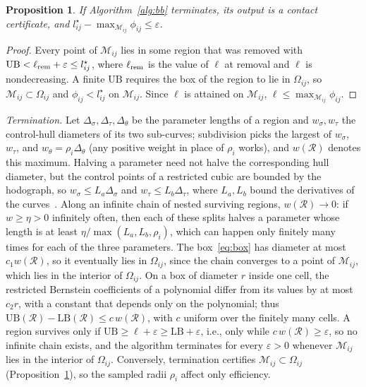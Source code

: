 \documentclass[journal]{IEEEtran}
\newtheorem{proposition}{Proposition}
\theoremstyle{definition}
\newcommand{\Mset}{\mathcal{M}}
\begin{document}
\begin{proposition}\label{prop:bb}
If Algorithm~\ref{alg:bb} terminates, its output is a contact certificate, and
$l^\star_{ij}-\max_{\Mset_{ij}}\phi_{ij}\le\varepsilon$.
\end{proposition}
\begin{proof}
Every point of $\Mset_{ij}$ lies in some region that was removed with
$\mathrm{UB}<\ell_{\rm rem}+\varepsilon\le l^\star_{ij}$, where $\ell_{\rm rem}$ is the value of
$\ell$ at removal and $\ell$ is nondecreasing. A finite $\mathrm{UB}$ requires the box of the region
to lie in $\Omega_{ij}$, so $\Mset_{ij}\subset\Omega_{ij}$ and $\phi_{ij}<l^\star_{ij}$ on
$\Mset_{ij}$. Since $\ell$ is attained on $\Mset_{ij}$, $\ell\le\max_{\Mset_{ij}}\phi_{ij}$.
\end{proof}

\emph{Termination.} Let $\Delta_\sigma,\Delta_\tau,\Delta_\theta$ be the parameter lengths of a
region and $w_\sigma,w_\tau$ the control-hull diameters of its two sub-curves; subdivision picks the
largest of $w_\sigma$, $w_\tau$, and $w_\theta=\rho_i\Delta_\theta$ (any positive weight in place of
$\rho_i$ works), and $w(\mathcal R)$ denotes this maximum. Halving a parameter need not halve the
corresponding hull diameter, but the control points of a restricted cubic are bounded by the
hodograph, so $w_\sigma\le L_a\Delta_\sigma$ and $w_\tau\le L_b\Delta_\tau$, where $L_a,L_b$ bound
the derivatives of the curves~\cite{farin2002curves}. Along an infinite chain of nested surviving
regions, $w(\mathcal R)\to0$: if $w\ge\eta>0$ infinitely often, then each of these splits halves a
parameter whose length is at least $\eta/\max(L_a,L_b,\rho_i)$, which can happen only finitely many
times for each of the three parameters. The box~\eqref{eq:box} has diameter at most
$c_1w(\mathcal R)$, so it eventually lies in $\Omega_{ij}$, since the chain converges to a point of
$\Mset_{ij}$, which lies in the interior of $\Omega_{ij}$. On a box of diameter $r$ inside one cell,
the restricted Bernstein coefficients of a polynomial differ from its values by at most $c_2r$, with
a constant that depends only on the polynomial; thus
$\mathrm{UB}(\mathcal R)-\mathrm{LB}(\mathcal R)\le c\,w(\mathcal R)$, with $c$ uniform over the
finitely many cells. A region survives only if $\mathrm{UB}\ge\ell+\varepsilon\ge\mathrm{LB}
+\varepsilon$, i.e., only while $c\,w(\mathcal R)\ge\varepsilon$, so no infinite chain exists, and
the algorithm terminates for every $\varepsilon>0$ whenever $\Mset_{ij}$ lies in the interior of
$\Omega_{ij}$. Conversely, termination certifies $\Mset_{ij}\subset\Omega_{ij}$
(Proposition~\ref{prop:bb}), so the sampled radii $\rho_i$ affect only efficiency.
\end{document}
